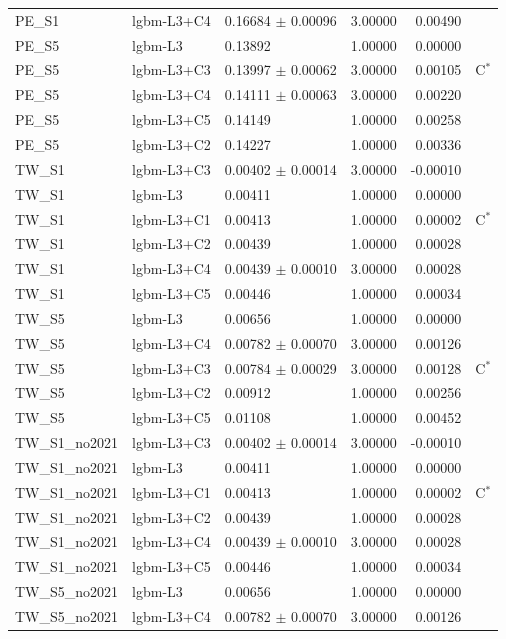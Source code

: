 \begin{tabular}{lllrrl}
PE\_S1 & lgbm-L3+C4 & 0.16684 $\pm$ 0.00096 & 3.00000 & 0.00490 &  \\
PE\_S5 & lgbm-L3 & 0.13892 & 1.00000 & 0.00000 &  \\
PE\_S5 & lgbm-L3+C3 & 0.13997 $\pm$ 0.00062 & 3.00000 & 0.00105 & C$^{*}$ \\
PE\_S5 & lgbm-L3+C4 & 0.14111 $\pm$ 0.00063 & 3.00000 & 0.00220 &  \\
PE\_S5 & lgbm-L3+C5 & 0.14149 & 1.00000 & 0.00258 &  \\
PE\_S5 & lgbm-L3+C2 & 0.14227 & 1.00000 & 0.00336 &  \\
TW\_S1 & lgbm-L3+C3 & 0.00402 $\pm$ 0.00014 & 3.00000 & -0.00010 &  \\
TW\_S1 & lgbm-L3 & 0.00411 & 1.00000 & 0.00000 &  \\
TW\_S1 & lgbm-L3+C1 & 0.00413 & 1.00000 & 0.00002 & C$^{*}$ \\
TW\_S1 & lgbm-L3+C2 & 0.00439 & 1.00000 & 0.00028 &  \\
TW\_S1 & lgbm-L3+C4 & 0.00439 $\pm$ 0.00010 & 3.00000 & 0.00028 &  \\
TW\_S1 & lgbm-L3+C5 & 0.00446 & 1.00000 & 0.00034 &  \\
TW\_S5 & lgbm-L3 & 0.00656 & 1.00000 & 0.00000 &  \\
TW\_S5 & lgbm-L3+C4 & 0.00782 $\pm$ 0.00070 & 3.00000 & 0.00126 &  \\
TW\_S5 & lgbm-L3+C3 & 0.00784 $\pm$ 0.00029 & 3.00000 & 0.00128 & C$^{*}$ \\
TW\_S5 & lgbm-L3+C2 & 0.00912 & 1.00000 & 0.00256 &  \\
TW\_S5 & lgbm-L3+C5 & 0.01108 & 1.00000 & 0.00452 &  \\
TW\_S1\_no2021 & lgbm-L3+C3 & 0.00402 $\pm$ 0.00014 & 3.00000 & -0.00010 &  \\
TW\_S1\_no2021 & lgbm-L3 & 0.00411 & 1.00000 & 0.00000 &  \\
TW\_S1\_no2021 & lgbm-L3+C1 & 0.00413 & 1.00000 & 0.00002 & C$^{*}$ \\
TW\_S1\_no2021 & lgbm-L3+C2 & 0.00439 & 1.00000 & 0.00028 &  \\
TW\_S1\_no2021 & lgbm-L3+C4 & 0.00439 $\pm$ 0.00010 & 3.00000 & 0.00028 &  \\
TW\_S1\_no2021 & lgbm-L3+C5 & 0.00446 & 1.00000 & 0.00034 &  \\
TW\_S5\_no2021 & lgbm-L3 & 0.00656 & 1.00000 & 0.00000 &  \\
TW\_S5\_no2021 & lgbm-L3+C4 & 0.00782 $\pm$ 0.00070 & 3.00000 & 0.00126 &  \\

\end{tabular}
